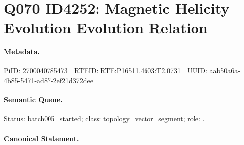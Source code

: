 \section*{Q070 ID4252: Magnetic Helicity Evolution Evolution Relation}
\paragraph{Metadata.}
PiID: 2700040785473 | RTEID: RTE:P16511.4603:T2.0731 | UUID: aab50a6a-4b85-5471-ad87-2ef21d372dee

\paragraph{Semantic Queue.}
Status: batch005\_started; class: topology\_vector\_segment; role: .

\paragraph{Canonical Statement.}
